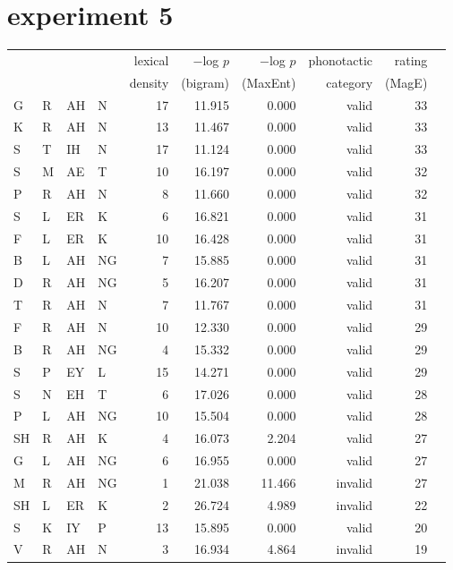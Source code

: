 \section{\citet{Scholes1966} experiment 5}    

\begin{longtable}{l@{ } l@{ } l@{ } l r r r r r r} 
\toprule
  &   &    &     & lexical & $-$log $p$ & $-$log $p$ & phonotactic & rating \\
&&&& density & (bigram) & (MaxEnt) & category & (MagE) \\
\midrule 
G  & R  & AH & N  & 17 & 11.915 & 0.000  & valid   & 33 \\
K  & R  & AH & N  & 13 & 11.467 & 0.000  & valid   & 33 \\
S  & T  & IH & N  & 17 & 11.124 & 0.000  & valid   & 33 \\
S  & M  & AE & T  & 10 & 16.197 & 0.000  & valid   & 32 \\
P  & R  & AH & N  & 8  & 11.660 & 0.000  & valid   & 32 \\
S  & L  & ER & K  & 6  & 16.821 & 0.000  & valid   & 31 \\
F  & L  & ER & K  & 10 & 16.428 & 0.000  & valid   & 31 \\
B  & L  & AH & NG & 7  & 15.885 & 0.000  & valid   & 31 \\
D  & R  & AH & NG & 5  & 16.207 & 0.000  & valid   & 31 \\
T  & R  & AH & N  & 7  & 11.767 & 0.000  & valid   & 31 \\
F  & R  & AH & N  & 10 & 12.330 & 0.000  & valid   & 29 \\
B  & R  & AH & NG & 4  & 15.332 & 0.000  & valid   & 29 \\
S  & P  & EY & L  & 15 & 14.271 & 0.000  & valid   & 29 \\
S  & N  & EH & T  & 6  & 17.026 & 0.000  & valid   & 28 \\
P  & L  & AH & NG & 10 & 15.504 & 0.000  & valid   & 28 \\
SH & R  & AH & K  & 4  & 16.073 & 2.204  & valid   & 27 \\
G  & L  & AH & NG & 6  & 16.955 & 0.000  & valid   & 27 \\
M  & R  & AH & NG & 1  & 21.038 & 11.466 & invalid & 27 \\
SH & L  & ER & K  & 2  & 26.724 & 4.989  & invalid & 22 \\
S  & K  & IY & P  & 13 & 15.895 & 0.000  & valid   & 20 \\
V  & R  & AH & N  & 3  & 16.934 & 4.864  & invalid & 19 \\

\end{longtable}
